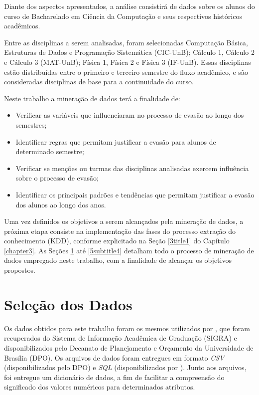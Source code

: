Diante dos aspectos apresentados, a análise consistirá de dados sobre os alunos do curso de Bacharelado em Ciência da Computação e seus respectivos históricos acadêmicos. 

Entre as disciplinas a serem analisadas, foram selecionadas Computação Básica, Estruturas de Dados e Programação Sistemática (CIC-UnB); Cálculo 1, Cálculo 2 e Cálculo 3 (MAT-UnB); Física 1, Física 2 e Física 3 (IF-UnB). Essas disciplinas estão distribuídas entre o primeiro e terceiro semestre do fluxo acadêmico, e são consideradas disciplinas de base para a continuidade do curso. 

Neste trabalho a mineração de dados terá a finalidade de:
\begin{itemize}
	\item Verificar as variáveis que influenciaram no processo de evasão ao longo dos semestres;
	\item Identificar regras que permitam justificar a evasão para alunos de determinado semestre;
	\item Verificar se menções ou turmas das disciplinas analisadas exercem influência sobre o processo de evasão;
	\item Identificar os principais padrões e tendências que permitam justificar a evasão dos alunos ao longo dos anos.
\end{itemize}

Uma vez definidos os objetivos a serem alcançados pela mineração de dados, a próxima etapa consiste na implementação das fases do processo extração do conhecimento (KDD), conforme explicitado na Seção \ref{3title1} do Capítulo \ref{chapter3}. As Seções \ref{5subtitle1} até \ref{5subtitle4} detalham todo o processo de mineração de dados empregado neste trabalho, com a finalidade de alcançar os objetivos propostos.


\section{Seleção dos Dados} \label{5subtitle1}

Os dados obtidos para este trabalho foram os mesmos utilizados por \citet{palmeira_santos2014}, que foram recuperados do Sistema de Informação Acadêmica de Graduação (SIGRA) e disponibilizados pelo Decanato de Planejamento e Orçamento da Universidade de Brasília (DPO). Os arquivos de dados foram entregues em formato \textit{CSV} (disponibilizados pelo DPO) e \textit{SQL} (disponibilizados por \citet{palmeira_santos2014}). Junto aos arquivos, foi entregue um dicionário de dados, a fim de facilitar a compreensão do significado dos valores numéricos para determinados atributos. 

